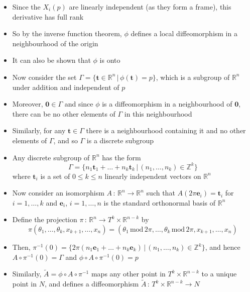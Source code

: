 \documentclass[12pt,a4paper]{article}
\numberwithin{equation}{section}
\begin{document}
\begin{itemize}
\begin{itemize}
			\item Since the $X_{i}(p)$ are linearly independent (as they form a frame), this derivative has full rank
			\item So by the inverse function theorem, $\phi$ defines a local diffeomorphism in a neighbourhood of the origin
			\item It can also be shown that $\phi$ is onto
			\item Now consider the set $\Gamma=\{\mathbf{t}\in \mathbb{R}^{n}\,|\, \phi(\mathbf{t})=p\}$, which is a subgroup of $\mathbb{R}^{n}$ under addition and independent of $p$
			\item Moreover, $\mathbf{0}\in\Gamma$ and since $\phi$ is a diffeomorphism in a neighbourhood of $\mathbf{0}$, there can be no other elements of $\Gamma$ in this neighbourhood
			\item Similarly, for any $\mathbf{t}\in \Gamma$ there is a neighbourhood containing it and no other elements of $\Gamma$, and so $\Gamma$ is a discrete subgroup
			\item Any discrete subgroup of $\mathbb{R}^{n}$ has the form
			\begin{equation}
				\Gamma=\{n_{1}\mathbf{t}_{1}+\ldots+n_{k}\mathbf{t}_{k}\,|\,(n_{1},\ldots,n_{k})\in\mathbb{Z}^{k}\}
			\end{equation}
			where $\mathbf{t}_{i}$ is a set of $0\leq k\leq n$ linearly independent vectors on $\mathbb{R}^{n}$
			\item Now consider an isomorphism $A\,:\,\mathbb{R}^{n}\to\mathbb{R}^{n}$ such that $A(2\pi\mathbf{e}_{i})=\mathbf{t}_{i}$ for $i=1,\ldots,k$ and $\mathbf{e}_{i}$, $i=1,\ldots,n$ is the standard orthonormal basis of $\mathbb{R}^{n}$
			\item Define the projection $\pi\,:\,\mathbb{R}^{n}\to T^{k}\times\mathbb{R}^{n-k}$ by
			\begin{equation}
				\pi(\theta_{1},\ldots,\theta_{k},x_{k+1},\ldots,x_{n})=(\theta_{1}\,\text{mod}\,2\pi,\ldots,\theta_{k}\,\text{mod}\,2\pi,x_{k+1},\dots,x_{n})
			\end{equation}
			\item Then, $\pi^{-1}(0)=\{2\pi(n_{1}\mathbf{e}_{1}+\ldots+n_{k}\mathbf{e}_{k})\,|\,(n_{1},\ldots,n_{k})\in \mathbb{Z}^{k}\}$, and hence $A\circ \pi^{-1}(0)=\Gamma$ and $\phi\circ A\circ\pi^{-1}(0)=p$
			\item Similarly, $\tilde{A}=\phi\circ A\circ\pi^{-1}$ maps any other point in $T^{k}\times\mathbb{R}^{n-k}$ to a unique point in $N$, and defines a diffeomorphism $\tilde{A}\,:\,T^{k}\times\mathbb{R}^{n-k}\to N$

\end{itemize}
\end{itemize}
\end{document}
